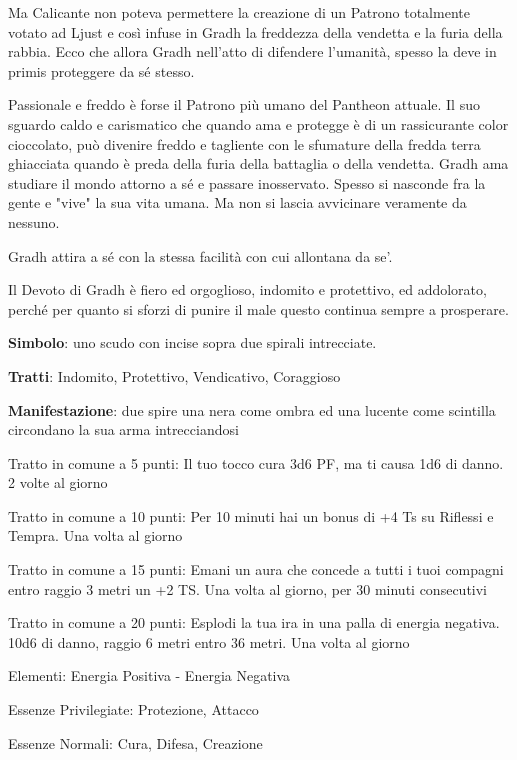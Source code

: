 \documentclass[a4paper,11pt,twoside,openany]{book}
\begin{document}
{Ma Calicante non poteva permettere la creazione di un Patrono totalmente votato ad Ljust e così infuse in Gradh la freddezza della vendetta e la furia della rabbia. Ecco che allora Gradh nell'atto di difendere l'umanità, spesso la deve in primis proteggere da sé stesso.

Passionale e freddo è forse il Patrono più umano del Pantheon attuale. Il suo sguardo caldo e carismatico che quando ama e protegge è di un rassicurante color cioccolato, può divenire freddo e tagliente con le sfumature della fredda terra ghiacciata quando è preda della furia della battaglia o della vendetta. Gradh ama studiare il mondo attorno a sé e passare inosservato. Spesso si nasconde fra la gente e "vive" la sua vita umana. Ma non si lascia avvicinare veramente da nessuno.

Gradh attira a sé con la stessa facilità con cui allontana da se'.

Il Devoto di Gradh è fiero ed orgoglioso, indomito e protettivo, ed addolorato, perché per quanto si sforzi di punire il male questo continua sempre a prosperare.

\textbf{Simbolo}: uno scudo con incise sopra due spirali intrecciate.

\textbf{Tratti}: Indomito, Protettivo, Vendicativo, Coraggioso

\textbf{Manifestazione}: due spire una nera come ombra ed una lucente come scintilla circondano la sua arma intrecciandosi

\bigskip

Tratto in comune a 5 punti: Il tuo tocco cura 3d6 PF, ma ti causa 1d6 di danno. 2 volte al giorno

Tratto in comune a 10 punti: Per 10 minuti hai un bonus di +4 Ts su Riflessi e Tempra. Una volta al giorno

Tratto in comune a 15 punti: Emani un aura che concede a tutti i tuoi compagni entro raggio 3 metri un +2 TS. Una volta al giorno, per 30 minuti consecutivi

Tratto in comune a 20 punti: Esplodi la tua ira in una palla di energia negativa. 10d6 di danno, raggio 6 metri entro 36 metri. Una volta al giorno

\bigskip

Elementi: Energia Positiva - Energia Negativa

\bigskip

Essenze Privilegiate: Protezione, Attacco

Essenze Normali: Cura, Difesa, Creazione

}
\end{document}
